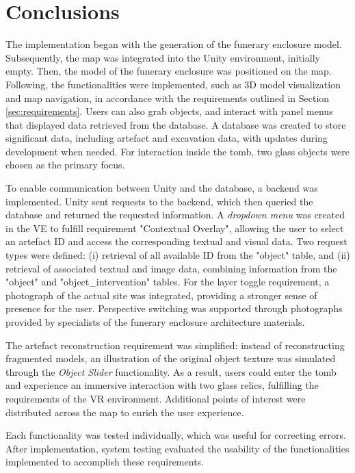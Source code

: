 \section{Conclusions}
\label{sec:impl_discussion}

The implementation began with the generation of the funerary enclosure model.
Subsequently, the map was integrated into the Unity environment, initially empty.
Then, the model of the funerary enclosure was positioned on the map.
Following, the functionalities were implemented, such as \gls{3D} model visualization and map navigation, in accordance with the requirements outlined in Section \ref{sec:requirements}. 
Users can also grab objects, and interact with panel menus that displayed data retrieved from the database. 
A database was created to store significant data, including artefact and excavation data, with updates during development when needed. For interaction inside the tomb, two glass objects were chosen as the primary focus.

To enable communication between Unity and the database, a backend was implemented. Unity sent requests to the backend, which then queried the database and returned the requested information. 
A \emph{dropdown menu} was created in the \gls{VE} to fulfill requirement "Contextual Overlay", allowing the user to select an artefact ID and access the corresponding textual and visual data. 
Two request types were defined: (i) retrieval of all available ID from the "object" table, and (ii) retrieval of associated textual and image data, combining information from the "object" and "object\_intervention" tables.
For the layer toggle requirement, a photograph of the actual site was integrated, providing a stronger sense of presence for the user. Perspective switching was supported through photographs provided by specialists of the funerary enclosure architecture materials. 

The artefact reconstruction requirement was simplified: instead of reconstructing fragmented models, an illustration of the original object texture was simulated through the \emph{Object Slider} functionality.
As a result, users could enter the tomb and experience an immersive interaction with two glass relics, fulfilling the requirements of the \gls{VR} environment. Additional points of interest were distributed across the map to enrich the user experience.

Each functionality was tested individually, which was useful for correcting errors. After implementation, system testing evaluated the usability of the functionalities implemented to accomplish these requirements.
